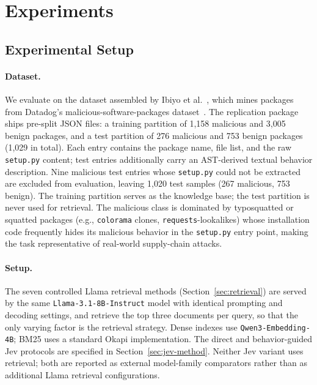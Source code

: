 \section{Experiments}
\label{sec:experiments}

\subsection{Experimental Setup}
\label{sec:experimental-setup}

\paragraph{Dataset.} We evaluate on the dataset assembled by
Ibiyo et al.~\cite{ease2025rag}, which mines packages from Datadog's
malicious-software-packages dataset~\cite{datadog-dataset}. The replication
package ships pre-split JSON files: a training partition of 1{,}158 malicious
and 3{,}005 benign packages, and a test partition of 276 malicious and 753
benign packages (1{,}029 in total). Each entry contains the package name,
file list, and the raw \texttt{setup.py} content; test entries additionally
carry an AST-derived textual behavior description. Nine malicious test
entries whose \texttt{setup.py} could not be extracted are excluded from evaluation, leaving 1{,}020 test
samples (267 malicious, 753 benign). The training partition serves as the
knowledge base; the test partition is never used for retrieval. The malicious
class is dominated by typosquatted or squatted packages (e.g.,
\texttt{colorama} clones, \texttt{requests}-lookalikes) whose installation
code frequently hides its malicious behavior in the \texttt{setup.py} entry
point, making the task representative of real-world supply-chain attacks.

\paragraph{Setup.} The seven controlled Llama retrieval methods (Section~\ref{sec:retrieval}) are served
by the same \texttt{Llama-3.1-8B-Instruct} model with identical prompting
and decoding settings, and retrieve the top three documents per query, so
that the only varying factor is the retrieval strategy. Dense indexes use
\texttt{Qwen3-Embedding-4B}; BM25 uses a standard Okapi implementation.
The direct and behavior-guided Jev protocols are specified in
Section~\ref{sec:jev-method}. Neither Jev variant uses retrieval; both are
reported as external model-family comparators rather than as additional Llama
retrieval configurations.

